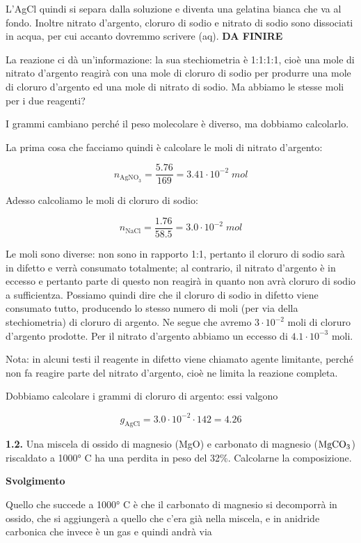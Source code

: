 L'AgCl quindi si separa dalla soluzione e diventa una gelatina bianca che va al fondo. Inoltre nitrato d'argento, cloruro di sodio e nitrato di sodio sono dissociati in acqua, per cui accanto dovremmo scrivere (aq). \textbf{DA FINIRE}

La reazione ci dà un'informazione: la sua stechiometria è 1:1:1:1, cioè una mole di nitrato d'argento reagirà con una mole di cloruro di sodio per produrre una mole di cloruro d'argento ed una mole di nitrato di sodio. Ma abbiamo le stesse moli per i due reagenti?

I grammi cambiano perché il peso molecolare è diverso, ma dobbiamo calcolarlo.

La prima cosa che facciamo quindi è calcolare le moli di nitrato d'argento:

$$n_{\text{AgNO}_3}=\frac{5.76}{169}=3.41 \cdot 10^{-2} \; mol $$

Adesso calcoliamo le moli di cloruro di sodio:

$$n_{\text{NaCl}}=\frac{1.76}{58.5}=3.0 \cdot 10^{-2} \; mol $$

Le moli sono diverse: non sono in rapporto 1:1, pertanto il cloruro di sodio sarà in difetto e verrà consumato totalmente; al contrario, il nitrato d'argento è in eccesso e pertanto parte di questo non reagirà in quanto non avrà cloruro di sodio a sufficientza. Possiamo quindi dire che il cloruro di sodio in difetto viene consumato tutto, producendo lo stesso numero di moli (per via della stechiometria) di cloruro di argento. Ne segue che avremo $3 \cdot 10^{-2}$ moli di cloruro d'argento prodotte. Per il nitrato d'argento abbiamo un eccesso di $4.1 \cdot 10^{-3}$ moli.

Nota: in alcuni testi il reagente in difetto viene chiamato agente limitante, perché non fa reagire parte del nitrato d'argento, cioè ne limita la reazione completa.

Dobbiamo calcolare i grammi di cloruro di argento: essi valgono

$$g_{\text{AgCl}}=3.0 \cdot 10^{-2} \cdot 142=4.26$$

\textbf{1.2.} Una miscela di ossido di magnesio (MgO) e carbonato di magnesio ($\rm MgCO_3$) riscaldato a 1000° C ha una perdita in peso del 32\%. Calcolarne la composizione.

\vspace{0.2cm}\large\textbf{Svolgimento}\normalsize

\vspace{0.2cm}Quello che succede a 1000° C è che il carbonato di magnesio si decomporrà in ossido, che si aggiungerà a quello che c'era già nella miscela, e in anidride carbonica che invece è un gas e quindi andrà via

